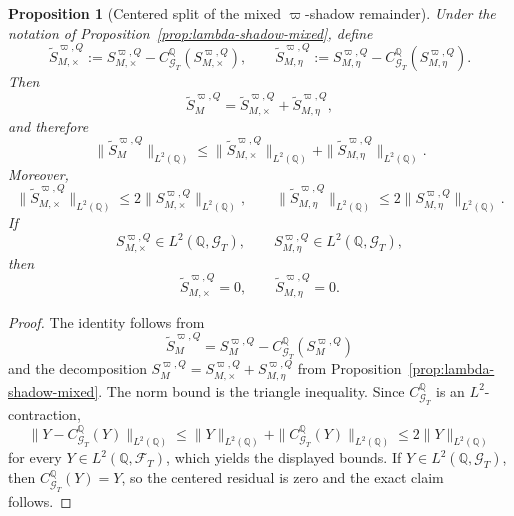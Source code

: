 \documentclass[11pt,a4paper]{amsart}
\theoremstyle{plain}
\newtheorem{proposition}[theorem]{Proposition}
\theoremstyle{definition}
\theoremstyle{remark}
\newcommand{\QQ}{\mathbb{Q}}
\newcommand{\cF}{\mathcal{F}}
\newcommand{\cG}{\mathcal{G}}
\begin{document}
\begin{proposition}[Centered split of the mixed \(\varpi\)-shadow remainder]\label{prop:lambda-shadow-mixed-centered}
Under the notation of Proposition~\ref{prop:lambda-shadow-mixed}, define
\[
        \widetilde S_{M,\times}^{\varpi,Q}
        :=
        S_{M,\times}^{\varpi,Q}
        -
        C_{\cG_T}^\QQ(S_{M,\times}^{\varpi,Q}),
        \qquad
        \widetilde S_{M,\eta}^{\varpi,Q}
        :=
        S_{M,\eta}^{\varpi,Q}
        -
        C_{\cG_T}^\QQ(S_{M,\eta}^{\varpi,Q}).
\]
Then
\[
        \widetilde S_{M}^{\varpi,Q}
        =
        \widetilde S_{M,\times}^{\varpi,Q}
        +
        \widetilde S_{M,\eta}^{\varpi,Q},
\]
and therefore
\[
        \|\widetilde S_{M}^{\varpi,Q}\|_{L^2(\QQ)}
        \le
        \|\widetilde S_{M,\times}^{\varpi,Q}\|_{L^2(\QQ)}
        +
        \|\widetilde S_{M,\eta}^{\varpi,Q}\|_{L^2(\QQ)}.
\]
Moreover,
\[
        \|\widetilde S_{M,\times}^{\varpi,Q}\|_{L^2(\QQ)}
        \le
        2\|S_{M,\times}^{\varpi,Q}\|_{L^2(\QQ)},
        \qquad
        \|\widetilde S_{M,\eta}^{\varpi,Q}\|_{L^2(\QQ)}
        \le
        2\|S_{M,\eta}^{\varpi,Q}\|_{L^2(\QQ)}.
\]
If
\[
        S_{M,\times}^{\varpi,Q}\in L^2(\QQ,\cG_T),
        \qquad
        S_{M,\eta}^{\varpi,Q}\in L^2(\QQ,\cG_T),
\]
then
\[
        \widetilde S_{M,\times}^{\varpi,Q}=0,
        \qquad
        \widetilde S_{M,\eta}^{\varpi,Q}=0.
\]
\end{proposition}

\begin{proof}
The identity follows from
\[
        \widetilde S_{M}^{\varpi,Q}
        =
        S_{M}^{\varpi,Q}
        -
        C_{\cG_T}^\QQ(S_{M}^{\varpi,Q})
\]
and the decomposition \(S_{M}^{\varpi,Q}=S_{M,\times}^{\varpi,Q}+S_{M,\eta}^{\varpi,Q}\) from
Proposition~\ref{prop:lambda-shadow-mixed}.  The norm bound is the triangle inequality.  Since
\(C_{\cG_T}^\QQ\) is an \(L^2\)-contraction,
\[
        \|Y-C_{\cG_T}^\QQ(Y)\|_{L^2(\QQ)}
        \le
        \|Y\|_{L^2(\QQ)}+\|C_{\cG_T}^\QQ(Y)\|_{L^2(\QQ)}
        \le
        2\|Y\|_{L^2(\QQ)}
\]
for every \(Y\in L^2(\QQ,\cF_T)\), which yields the displayed bounds.  If
\(Y\in L^2(\QQ,\cG_T)\), then \(C_{\cG_T}^\QQ(Y)=Y\), so the centered residual is zero and the
exact claim follows.
\end{proof}
\end{document}
